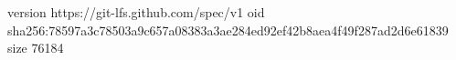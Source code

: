 version https://git-lfs.github.com/spec/v1
oid sha256:78597a3c78503a9c657a08383a3ae284ed92ef42b8aea4f49f287ad2d6e61839
size 76184
